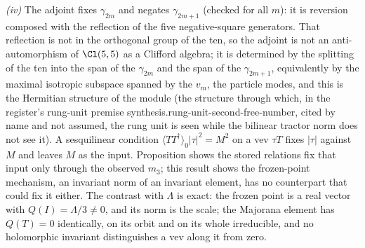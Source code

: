 \emph{(iv)} The adjoint fixes $\gamma_{2m}$ and negates $\gamma_{2m+1}$ (checked for all $m$): it is reversion composed with the reflection of the five negative-square generators. That reflection is not in the orthogonal group of the ten, so the adjoint is not an anti-automorphism of $\Cl(5,5)$ as a Clifford algebra; it is determined by the splitting of the ten into the span of the $\gamma_{2m}$ and the span of the $\gamma_{2m+1}$, equivalently by the maximal isotropic subspace spanned by the $v_{m}$, the particle modes, and this is the Hermitian structure of the module (the structure through which, in the register's rung-unit premise synthesis.rung-unit-second-free-number, cited by name and not assumed, the rung unit is seen while the bilinear tractor norm does not see it). A sesquilinear condition $\langle TT^{\dagger}\rangle_{0}|\tau|^{2} = M^{2}$ on a vev $\tau T$ fixes $|\tau|$ against $M$ and leaves $M$ as the input. Proposition  shows the stored relations fix that input only through the observed $m_{3}$; this result shows the frozen-point mechanism, an invariant norm of an invariant element, has no counterpart that could fix it either. The contrast with $\Lambda$ is exact: the frozen point is a real vector with $Q(I) = \Lambda/3 \neq 0$, and its norm is the scale; the Majorana element has $Q(T) = 0$ identically, on its orbit and on its whole irreducible, and no holomorphic invariant distinguishes a vev along it from zero.
